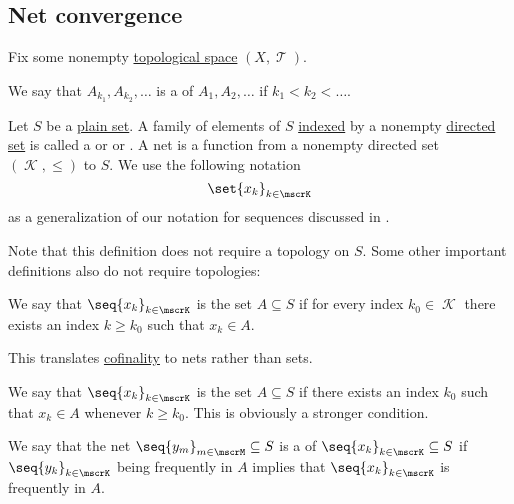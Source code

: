 \subsection{Net convergence}\label{subsec:net_convergence}

Fix some nonempty \hyperref[def:topological_space]{topological space} \( (X, \mscrT) \).

\begin{definition}\label{def:subsequence}
  We say that \( A_{k_1}, A_{k_2}, \ldots \) is a  of \( A_1, A_2, \ldots \) if \( k_1 < k_2 < \ldots \).
\end{definition}

\begin{definition}\label{def:topological_net}
  Let \( S \) be a \hyperref[def:set]{plain set}. A family of elements of \( S \) \hyperref[def:cartesian_product/indexed_family]{indexed} by a nonempty \hyperref[def:directed_set]{directed set} is called a  or  or . A net is a function from a nonempty directed set \( (\mscrK, \leq) \) to \( S \). We use the following notation
  \begin{equation*}
    \set{ x_k }_{k \in \mscrK}
  \end{equation*}
  as a generalization of our notation for sequences discussed in .

  Note that this definition does not require a topology on \( S \). Some other important definitions also do not require topologies:
  \begin{thmenum}
     We say that \( \seq{ x_k }_{k \in \mscrK} \) is  the set \( A \subseteq S \) if for every index \( k_0 \in \mscrK \) there exists an index \( k \geq k_0 \) such that \( x_k \in A \).

    This translates \hyperref[def:cofinal_set]{cofinality} to nets rather than sets.

     We say that \( \seq{ x_k }_{k \in \mscrK} \) is  the set \( A \subseteq S \) if there exists an index \( k_0 \) such that \( x_k \in A \) whenever \( k \geq k_0 \). This is obviously a stronger condition.

     We say that the net \( \seq{ y_m }_{m \in \mscrM} \subseteq S \) is a  of \( \seq{ x_k }_{k \in \mscrK} \subseteq S \) if \( \seq{ y_k }_{k \in \mscrK} \) being frequently in \( A \) implies that \( \seq{ x_k }_{k \in \mscrK} \) is frequently in \( A \).
  \end{thmenum}
\end{definition}

